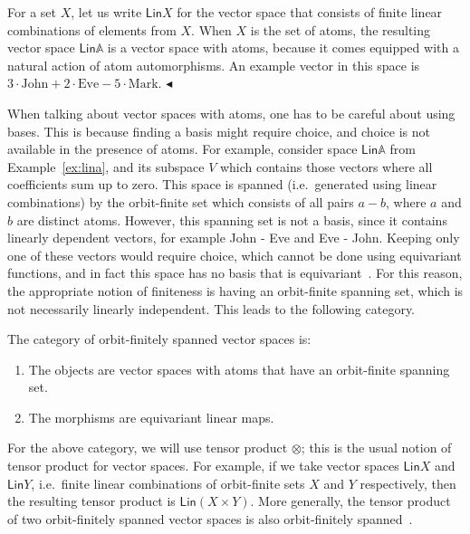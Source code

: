 \documentclass[10pt,a4paper]{amsart}
\numberwithin{equation}{section}
\theoremstyle{plain}
\newcommand{\atoms}{\mathbb A}
\newcommand{\Lin}{\mathsf{Lin}}
\newcommand{\exampleend}{$\blacktriangleleft$}
\begin{document}
\begin{example} \label{ex:lina} For a set $X$, let us write $\Lin X$ for the vector space that consists of finite linear combinations of elements from $X$. When $X$ is the set of atoms, the resulting vector space $\Lin \atoms$ is a vector space with atoms, because it comes equipped with a natural action of atom automorphisms.  An example vector in this space is $
3 \cdot \text{John} + 2 \cdot \text{Eve} - 5 \cdot \text{Mark}.
$ \exampleend
\end{example}

When talking about vector spaces with atoms, one has to be careful about using bases. This is because finding a basis might require choice, and choice is not available in the presence of atoms. 
For example, consider space $\Lin \atoms$ from Example~\ref{ex:lina}, and its subspace $V$ which contains those vectors where all coefficients sum up to zero. This space is spanned (i.e.~generated using linear combinations) by the orbit-finite set which consists of all pairs $a - b$, where $a$ and $b$ are distinct atoms.
However, this spanning set is not a basis, since it contains linearly dependent vectors, for example John - Eve and Eve - John. Keeping only one of these vectors would require choice, which cannot be done using equivariant functions, and in fact this space has no basis that is equivariant~\cite[Example 6]{bojanczykKM21OrbitFiniteVector}. For this reason, the appropriate notion of finiteness is having an orbit-finite spanning set, which is not necessarily linearly independent. This leads to the following category.

\begin{definition}\label{def:orbit-finite-vector-space-category}
    The category of orbit-finitely spanned vector spaces is:
    \begin{enumerate}
        \item The objects are vector spaces with atoms that have an orbit-finite spanning set.
        \item The morphisms are equivariant linear maps.
    \end{enumerate}
\end{definition}

For the above category, we will use tensor product $\otimes$; this is the usual notion of tensor product for vector spaces. For example, if we take vector spaces $\Lin X$ and $\Lin Y$, i.e.~finite linear combinations of orbit-finite sets $X$ and $Y$ respectively, then the resulting tensor product is $\Lin (X \times Y)$. More generally, the tensor product of two orbit-finitely spanned vector spaces is also orbit-finitely spanned~\cite[Theorem VI.3]{bojanczykKM21OrbitFiniteVector}. 
\end{document}

